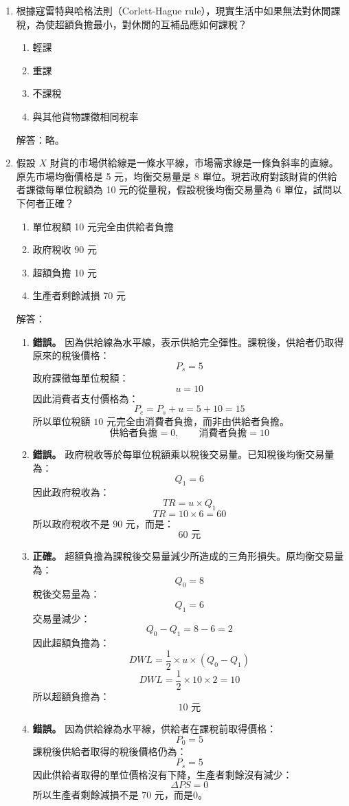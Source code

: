 \documentclass[12pt, a4paper]{article}
\begin{document}
\begin{enumerate}
    \item 根據寇雷特與哈格法則（Corlett-Hague rule），現實生活中如果無法對休閒課稅，為使超額負擔最小，對休閒的互補品應如何課稅？
    \begin{enumerate}[label=\Alph*.]
        \item 輕課
        \item 重課
        \item 不課稅
        \item 與其他貨物課徵相同稅率
    \end{enumerate}
    解答：略。

    \item 假設 \(X\) 財貨的市場供給線是一條水平線，市場需求線是一條負斜率的直線。原先市場均衡價格是 5 元，均衡交易量是 8 單位。現若政府對該財貨的供給者課徵每單位稅額為 10 元的從量稅，假設稅後均衡交易量為 6 單位，試問以下何者正確？
    \begin{enumerate}[label=\Alph*.]
        \item 單位稅額 10 元完全由供給者負擔
        \item 政府稅收 90 元
        \item 超額負擔 10 元
        \item 生產者剩餘減損 70 元
    \end{enumerate}
    解答：
    \begin{enumerate}[label=\Alph*.]
    \item \textbf{錯誤。}
    因為供給線為水平線，表示供給完全彈性。課稅後，供給者仍取得原來的稅後價格：
    \[
    P_s = 5
    \]
    政府課徵每單位稅額：
    \[
    u = 10
    \]
    因此消費者支付價格為：
    \[
    P_c = P_s + u = 5 + 10 = 15
    \]
    所以單位稅額 \(10\) 元完全由消費者負擔，而非由供給者負擔。
    \[
    \text{供給者負擔} = 0,\qquad \text{消費者負擔} = 10
    \]
    \item \textbf{錯誤。}
    政府稅收等於每單位稅額乘以稅後交易量。已知稅後均衡交易量為：
    \[
    Q_1 = 6
    \]
    因此政府稅收為：
    \[
    TR = u \times Q_1
    \]
    \[
    TR = 10 \times 6 = 60
    \]
    所以政府稅收不是 \(90\) 元，而是：
    \[
    \boxed{60\text{ 元}}
    \]
    \item \textbf{正確。}
    超額負擔為課稅後交易量減少所造成的三角形損失。原均衡交易量為：
    \[
    Q_0 = 8
    \]
    稅後交易量為：
    \[
    Q_1 = 6
    \]
    交易量減少：
    \[
    Q_0 - Q_1 = 8 - 6 = 2
    \]
    因此超額負擔為：
    \[
    DWL = \frac{1}{2} \times u \times (Q_0 - Q_1)
    \]
    \[
    DWL = \frac{1}{2} \times 10 \times 2 = 10
    \]
    所以超額負擔為：
    \[
    \boxed{10\text{ 元}}
    \]
    \item \textbf{錯誤。}
    因為供給線為水平線，供給者在課稅前取得價格：
    \[
    P_0 = 5
    \]
    課稅後供給者取得的稅後價格仍為：
    \[
    P_s = 5
    \]
    因此供給者取得的單位價格沒有下降，生產者剩餘沒有減少：
    \[
    \Delta PS = 0
    \]
    所以生產者剩餘減損不是 \(70\) 元，而是0。
    \end{enumerate}


\end{enumerate}
\end{document}
